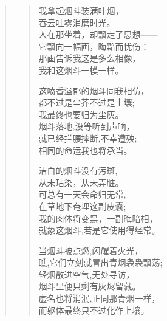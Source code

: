\documentclass[openany,oneside]{book}
\theoremstyle{cthmstyle}
\theoremstyle{definition}
\theoremstyle{remark}
\begin{document}
\begin{quote}
    \begin{verse}
        我拿起烟斗装满叶烟，\\
        \hspace{1em}吞云吐雾消磨时光。\\
        人在那坐着，却飘走了思想------\\
        \hspace{1em}它飘向一幅画，晦黯而忧伤：\\
        \hspace{2em}那画告诉我这是多么相像，\\
        \hspace{2em}我和这烟斗一模一样。\\
        \vspace{1em}
        
        这喷香溢郁的烟斗同我相仿，\\
        \hspace{1em}都不过是尘芥不过是土壤;\\
        我最终也要归为尘灰。\\
        \hspace{1em}烟斗落地,没等听到声响，\\
        \hspace{2em}就已经拦腰摔断,不幸遭殃;\\
        \hspace{2em}相同的命运我也将承当。\par
        \vspace{1em}
        
        洁白的烟斗没有污斑,\\
        \hspace{1em}从未玷染，从未弄脏。\\
        可总有一天会命归无常, \\
        \hspace{1em}在草地下奄埋这副皮囊;\\
        \hspace{2em}我的肉体将变黑，一副晦暗相，\\
        \hspace{2em}就象这烟斗,若是它使用得经常。\\
        \vspace{1em}
        
        当烟斗被点燃,闪耀着火光，\\
        \hspace{1em}瞧,它们立刻就冒出青烟袅袅飘荡;\\
        轻烟散进空气,无处寻访，\\
        \hspace{1em}烟斗里便只剩有灰烬留藏。\\
        \hspace{2em}虚名也将消泯,正同那青烟一样，\\
        \hspace{2em}而躯体最终只不过化作上壤。\\
        \vspace{1em}
        

\end{verse}
\end{quote}
\end{document}
